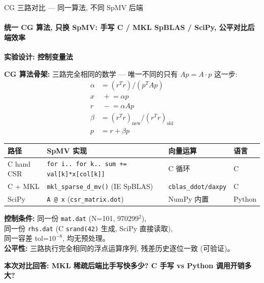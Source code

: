 \documentclass[12pt,aspectratio=169]{beamer}
\begin{document}
\begin{frame}[shrink]{CG 三路对比 — 同一算法, 不同 SpMV 后端}
\framesubtitle{统一 CG 算法, 只换 SpMV: 手写 C / MKL SpBLAS / SciPy, 公平对比后端效率}

\textbf{实验设计: 控制变量法}

\vspace{2pt}
\footnotesize
\textbf{CG 算法骨架:} 三路完全相同的数学 — 唯一不同的只有 $Ap = A \cdot p$ 这一步:
\[
\begin{aligned}
\alpha &= (r^T r) / (p^T Ap) \\
x &\;+\!\!= \alpha p  \\
r &\;-\!\!= \alpha Ap  \\
\beta &= (r^T r)_{\text{new}} / (r^T r)_{\text{old}} \\
p &= r + \beta p
\end{aligned}
\]

\vspace{2pt}
\begin{center}
\renewcommand{\arraystretch}{1.15}
\setlength{\tabcolsep}{5pt}
\begin{tabular}{@{}l l l l@{}}
\toprule
\textbf{路径} & \textbf{SpMV 实现} & \textbf{向量运算} & \textbf{语言} \\
\midrule
C hand CSR & \texttt{for i.. for k.. sum += val[k]*x[col[k]]} & C 循环 & C \\
C + MKL     & \texttt{mkl\_sparse\_d\_mv()} (IE SpBLAS) & \texttt{cblas\_ddot/daxpy} & C \\
SciPy       & \texttt{A @ x} (\texttt{csr\_matrix.dot}) & NumPy 内置 & Python \\
\bottomrule
\end{tabular}
\end{center}
\normalsize

\vspace{4pt}
\small
\textbf{控制条件:} 同一份 \texttt{mat.dat} (N=101, 970299$^2$), \\
同一份 \texttt{rhs.dat} (C \texttt{srand(42)} 生成, SciPy 直接读取), \\
同一容差 tol=$10^{-8}$, 均无预处理。 \\
\textbf{公平性:} 三路执行完全相同的浮点运算序列, 残差历史逐位一致 (可验证)。

\vspace{2pt}
\begin{center}
\footnotesize \textbf{本次对比回答: MKL 稀疏后端比手写快多少? C 手写 vs Python 调用开销多大?}
\end{center}
\end{frame}
\end{document}
